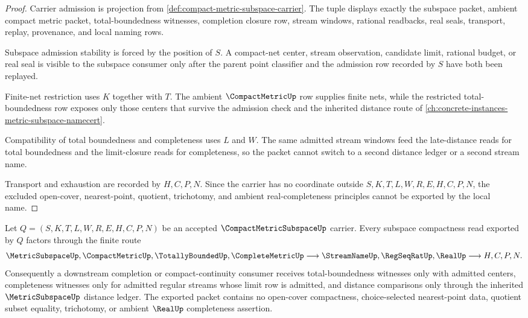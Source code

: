 \begin{proof}
Carrier admission is projection from \autoref{def:compact-metric-subspace-carrier}. The tuple displays exactly the subspace packet, ambient compact metric packet, total-boundedness witnesses, completion closure row, stream windows, rational readbacks, real seals, transport, replay, provenance, and local naming rows.

Subspace admission stability is forced by the position of $S$. A compact-net center, stream observation, candidate limit, rational budget, or real seal is visible to the subspace consumer only after the parent point classifier and the admission row recorded by $S$ have both been replayed.

Finite-net restriction uses $K$ together with $T$. The ambient $\CompactMetricUp$ row supplies finite nets, while the restricted total-boundedness row exposes only those centers that survive the admission check and the inherited distance route of \autoref{ch:concrete-instances-metric-subspace-namecert}.

Compatibility of total boundedness and completeness uses $L$ and $W$. The same admitted stream windows feed the late-distance reads for total boundedness and the limit-closure reads for completeness, so the packet cannot switch to a second distance ledger or a second stream name.

Transport and exhaustion are recorded by $H,C,P,N$. Since the carrier has no coordinate outside $S,K,T,L,W,R,E,H,C,P,N$, the excluded open-cover, nearest-point, quotient, trichotomy, and ambient real-completeness principles cannot be exported by the local name.
\end{proof}

\begin{theorem}
\label{thm:compact-metric-subspace-inherited-total-bounded-completeness}
Let $Q=(S,K,T,L,W,R,E,H,C,P,N)$ be an accepted $\CompactMetricSubspaceUp$ carrier. Every subspace compactness read exported by $Q$ factors through the finite route
$$
\MetricSubspaceUp,\CompactMetricUp,\TotallyBoundedUp,\CompleteMetricUp
\longrightarrow \StreamNameUp,\RegSeqRatUp,\RealUp
\longrightarrow H,C,P,N .
$$
Consequently a downstream completion or compact-continuity consumer receives total-boundedness witnesses only with admitted centers, completeness witnesses only for admitted regular streams whose limit row is admitted, and distance comparisons only through the inherited $\MetricSubspaceUp$ distance ledger. The exported packet contains no open-cover compactness, choice-selected nearest-point data, quotient subset equality, trichotomy, or ambient $\RealUp$ completeness assertion.
\end{theorem}

